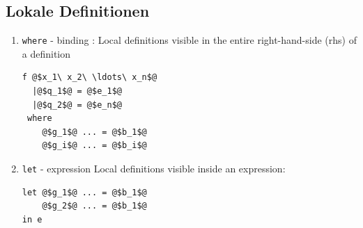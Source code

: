\documentclass{article}
\newcommand{\Haskell}[1]{\texttt{#1}}
\begin{document}
\subsection{Lokale Definitionen}
\begin{enumerate}
\item \Haskell{where} - binding : Local definitions visible in the entire right-hand-side (rhs) of a definition
\begin{verbatim}
f @$x_1\ x_2\ \ldots\ x_n$@
  |@$q_1$@ = @$e_1$@
  |@$q_2$@ = @$e_n$@
 where 
    @$g_1$@ ... = @$b_1$@
    @$g_i$@ ... = @$b_i$@
\end{verbatim}
\item \Haskell{let} - expression Local definitions visible inside an expression:
\begin{verbatim}
let @$g_1$@ ... = @$b_1$@
    @$g_2$@ ... = @$b_1$@
in e
\end{verbatim}
\end{enumerate}
\end{document}

